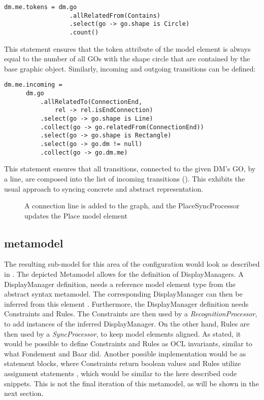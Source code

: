 \begin{lstlisting}[captionpos=b,caption={Rule that syncs the token count of a place element}]
dm.me.tokens = dm.go
                  .allRelatedFrom(Contains)
                  .select(go -> go.shape is Circle)
                  .count()
\end{lstlisting}

This statement ensures that the token attribute of the model element is always equal to the number of all GOs with the shape circle that are contained by the base graphic object. Similarly, incoming and outgoing transitions can be defined:
\begin{lstlisting}[captionpos=b,caption={Rule that syncs incoming transitions of a place element},label={lst:incoming-transitions}]
dm.me.incoming = 
      dm.go
          .allRelatedTo(ConnectionEnd,
              rel -> rel.isEndConnection)
          .select(go -> go.shape is Line)
          .collect(go -> go.relatedFrom(ConnectionEnd))
          .select(go -> go.shape is Rectangle)
          .select(go -> go.dm != null)
          .collect(go -> go.dm.me)
\end{lstlisting}

This statement ensures that all transitions, connected to the given DM's GO, by a line, are composed into the list of incoming transitions (). This exhibits the usual approach to syncing concrete and abstract representation.


\begin{figure}[h]
  \centering
  
  \caption{A connection line is added to the graph, and the PlaceSyncProcessor updates the Place model element}
  \label{fig:incoming-sync}
\end{figure}

\subsection{metamodel}
The resulting sub-model for this area of the configuration would look as described in . The depicted Metamodel allows for the definition of DisplayManagers. A DisplayManager definition, needs a reference model element type from the abstract syntax metamodel. The corresponding DisplayManager can then be inferred from this element . Furthermore, the DisplayManager definition needs Constraints and Rules. The Constraints are then used by a \emph{RecognitionProcessor}, to add instances of the inferred DisplayManager. On the other hand, Rules are then used by a \emph{SyncProcessor}, to keep model elements aligned. As stated, it would be possible to define Constraints and Rules as OCL invariants, similar to what Fondement and Baar did. Another possible implementation would be as statement blocks, where Constraints return boolean values and Rules utilize assignment statements , which would be similar to the here described code snippets. This is not the final iteration of this metamodel, as will be shown in the next section.

